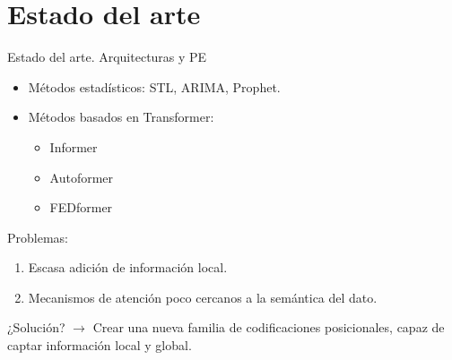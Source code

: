 \documentclass[compress]{beamer}
\begin{document}
	\section{Estado del arte}
	
	\begin{frame}{Estado del arte. Arquitecturas y PE}
		\begin{itemize}
			\item Métodos estadísticos: STL, ARIMA, Prophet.
			 
			\item Métodos basados en Transformer:
		
			\begin{itemize}
				\item Informer
				\item Autoformer
				\item FEDformer
			\end{itemize}
		\end{itemize}
		
		Problemas:
		\begin{enumerate}
			\item Escasa adición de información local.
			\item Mecanismos de atención poco cercanos a la semántica del dato.
		\end{enumerate}
		¿Solución? $\rightarrow$ Crear una nueva familia de codificaciones posicionales, capaz de captar información local y global.
	\end{frame}	 	
\end{document}
